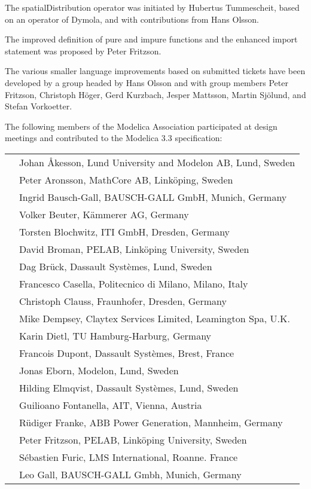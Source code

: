 The spatialDistribution operator was initiated by Hubertus Tummescheit,
based on an operator of Dymola, and with contributions from Hans Olsson.

The improved definition of pure and impure functions and the enhanced
import statement was proposed by Peter Fritzson.

The various smaller language improvements based on submitted tickets
have been developed by a group headed by Hans Olsson and with group
members Peter Fritzson, Christoph Höger, Gerd Kurzbach, Jesper Mattsson,
Martin Sjölund, and Stefan Vorkoetter.

The following members of the Modelica Association participated at design
meetings and contributed to the Modelica 3.3 specification:

\begin{longtable}{p{0.3cm}p{14cm}}
&Johan Åkesson, Lund University and Modelon AB, Lund, Sweden\\
&Peter Aronsson, MathCore AB, Linköping, Sweden\\
&Ingrid Bausch-Gall, BAUSCH-GALL GmbH, Munich, Germany\\
&Volker Beuter, Kämmerer AG, Germany\\
&Torsten Blochwitz, ITI GmbH, Dresden, Germany\\
&David Broman, PELAB, Linköping University, Sweden\\
&Dag Brück, Dassault Systèmes, Lund, Sweden\\
&Francesco Casella, Politecnico di Milano, Milano, Italy\\
&Christoph Clauss, Fraunhofer, Dresden, Germany\\
&Mike Dempsey, Claytex Services Limited, Leamington Spa, U.K.\\
&Karin Dietl, TU Hamburg-Harburg, Germany\\
&Francois Dupont, Dassault Systèmes, Brest, France\\
&Jonas Eborn, Modelon, Lund, Sweden\\
&Hilding Elmqvist, Dassault Systèmes, Lund, Sweden\\
&Guilioano Fontanella, AIT, Vienna, Austria\\
&Rüdiger Franke, ABB Power Generation, Mannheim, Germany\\
&Peter Fritzson, PELAB, Linköping University, Sweden\\
&Sébastien Furic, LMS International, Roanne. France\\
&Leo Gall, BAUSCH-GALL Gmbh, Munich, Germany\\

\end{longtable}
